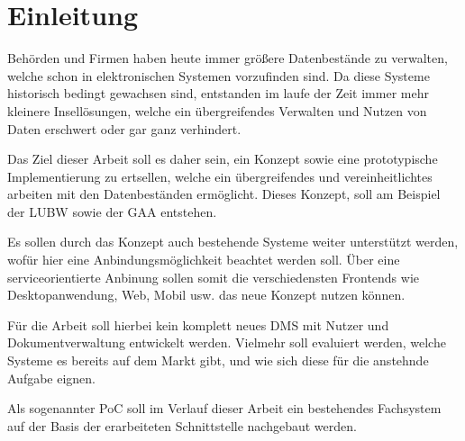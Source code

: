 \section{Einleitung} \label{Einfuehrung}
Beh\"orden und Firmen haben heute immer gr\"o\ss{}ere Datenbest\"ande zu verwalten, welche schon in elektronischen Systemen vorzufinden sind. Da diese Systeme historisch bedingt gewachsen sind, entstanden im laufe der Zeit immer mehr kleinere Insell\"osungen, welche ein \"ubergreifendes Verwalten und Nutzen von Daten erschwert oder gar ganz verhindert.

Das Ziel dieser Arbeit soll es daher sein, ein Konzept sowie eine prototypische Implementierung zu ertsellen, welche ein \"ubergreifendes und vereinheitlichtes arbeiten mit den Datenbest\"anden erm\"oglicht. Dieses Konzept, soll am Beispiel der \ac{LUBW} sowie der \ac{GAA} entstehen.

Es sollen durch das Konzept auch bestehende Systeme weiter unterst\"utzt werden, wof\"ur hier eine Anbindungsm\"oglichkeit beachtet werden soll. \"Uber eine serviceorientierte Anbinung sollen somit die verschiedensten Frontends wie Desktopanwendung, Web, Mobil usw. das neue Konzept nutzen k\"onnen.

F\"ur die Arbeit soll hierbei kein komplett neues \ac{DMS} mit Nutzer und Dokumentverwaltung entwickelt werden. Vielmehr soll evaluiert werden, welche Systeme es bereits auf dem Markt gibt, und wie sich diese f\"ur die anstehnde Aufgabe eignen. 

Als sogenannter \ac{PoC} soll im Verlauf dieser Arbeit ein bestehendes Fachsystem auf der Basis der erarbeiteten Schnittstelle nachgebaut werden.